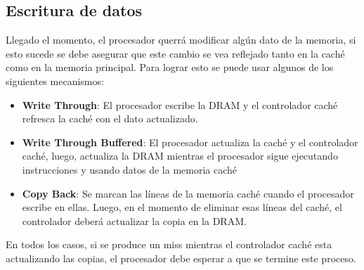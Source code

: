 \subsection{Escritura de datos}
Llegado el momento, el procesador querrá modificar algún dato de la memoria, si esto sucede se debe asegurar que este cambio se vea reflejado tanto en la caché como en la memoria principal. Para lograr esto se puede usar algunos de los siguientes mecanismos:
\begin{itemize}
	\item\textbf{Write Through}: El procesador escribe la DRAM y el controlador caché refresca la caché con el dato actualizado.
	\item\textbf{Write Through Buffered}: El procesador actualiza la caché y el controlador caché, luego, actualiza la DRAM mientras el procesador sigue ejecutando instrucciones y usando datos de la memoria caché
	\item\textbf{Copy Back}: Se marcan las líneas de la memoria caché cuando el procesador escribe en ellas. Luego, en el momento de eliminar esas líneas del caché, el controlador deberá actualizar la copia en la DRAM.
\end{itemize}

En todos los casos, si se produce un miss mientras el controlador caché esta actualizando las copias, el procesador debe esperar a que se termine este proceso.
\nocite{*}




